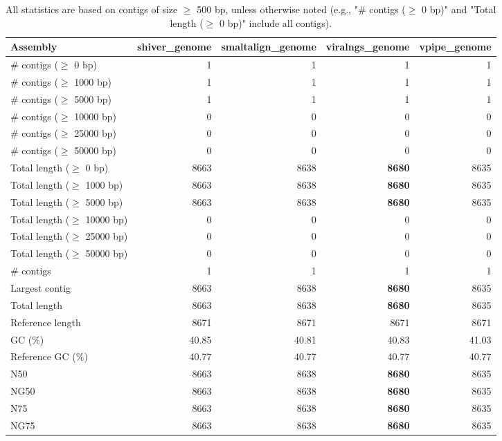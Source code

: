 \documentclass[12pt,a4paper]{article}
\begin{document}
\begin{table}[ht]
\begin{center}
\caption{All statistics are based on contigs of size $\geq$ 500 bp, unless otherwise noted (e.g., "\# contigs ($\geq$ 0 bp)" and "Total length ($\geq$ 0 bp)" include all contigs).}
\begin{tabular}{|l*{4}{|r}|}
\hline
Assembly & shiver\_genome & smaltalign\_genome & viralngs\_genome & vpipe\_genome \\ \hline
\# contigs ($\geq$ 0 bp) & 1 & 1 & 1 & 1 \\ \hline
\# contigs ($\geq$ 1000 bp) & 1 & 1 & 1 & 1 \\ \hline
\# contigs ($\geq$ 5000 bp) & 1 & 1 & 1 & 1 \\ \hline
\# contigs ($\geq$ 10000 bp) & 0 & 0 & 0 & 0 \\ \hline
\# contigs ($\geq$ 25000 bp) & 0 & 0 & 0 & 0 \\ \hline
\# contigs ($\geq$ 50000 bp) & 0 & 0 & 0 & 0 \\ \hline
Total length ($\geq$ 0 bp) & 8663 & 8638 & {\bf 8680} & 8635 \\ \hline
Total length ($\geq$ 1000 bp) & 8663 & 8638 & {\bf 8680} & 8635 \\ \hline
Total length ($\geq$ 5000 bp) & 8663 & 8638 & {\bf 8680} & 8635 \\ \hline
Total length ($\geq$ 10000 bp) & 0 & 0 & 0 & 0 \\ \hline
Total length ($\geq$ 25000 bp) & 0 & 0 & 0 & 0 \\ \hline
Total length ($\geq$ 50000 bp) & 0 & 0 & 0 & 0 \\ \hline
\# contigs & 1 & 1 & 1 & 1 \\ \hline
Largest contig & 8663 & 8638 & {\bf 8680} & 8635 \\ \hline
Total length & 8663 & 8638 & {\bf 8680} & 8635 \\ \hline
Reference length & 8671 & 8671 & 8671 & 8671 \\ \hline
GC (\%) & 40.85 & 40.81 & 40.83 & 41.03 \\ \hline
Reference GC (\%) & 40.77 & 40.77 & 40.77 & 40.77 \\ \hline
N50 & 8663 & 8638 & {\bf 8680} & 8635 \\ \hline
NG50 & 8663 & 8638 & {\bf 8680} & 8635 \\ \hline
N75 & 8663 & 8638 & {\bf 8680} & 8635 \\ \hline
NG75 & 8663 & 8638 & {\bf 8680} & 8635 \\ \hline

\end{tabular}
\end{center}
\end{table}
\end{document}

